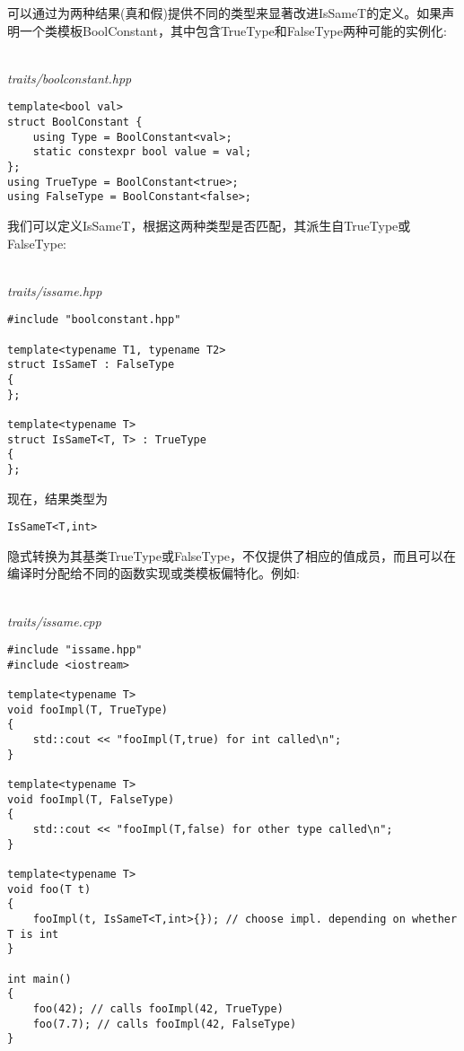可以通过为两种结果(真和假)提供不同的类型来显著改进IsSameT的定义。如果声明一个类模板BoolConstant，其中包含TrueType和FalseType两种可能的实例化:

\hspace*{\fill} \\ %
\noindent
\textit{traits/boolconstant.hpp}
\begin{lstlisting}[style=styleCXX]
template<bool val>
struct BoolConstant {
	using Type = BoolConstant<val>;
	static constexpr bool value = val;
};
using TrueType = BoolConstant<true>;
using FalseType = BoolConstant<false>;
\end{lstlisting}

我们可以定义IsSameT，根据这两种类型是否匹配，其派生自TrueType或FalseType:

\hspace*{\fill} \\ %
\noindent
\textit{traits/issame.hpp}
\begin{lstlisting}[style=styleCXX]
#include "boolconstant.hpp"

template<typename T1, typename T2>
struct IsSameT : FalseType
{
};

template<typename T>
struct IsSameT<T, T> : TrueType
{
};
\end{lstlisting}

现在，结果类型为

\begin{lstlisting}[style=styleCXX]
IsSameT<T,int>
\end{lstlisting}

隐式转换为其基类TrueType或FalseType，不仅提供了相应的值成员，而且可以在编译时分配给不同的函数实现或类模板偏特化。例如:

\hspace*{\fill} \\ %
\noindent
\textit{traits/issame.cpp}
\begin{lstlisting}[style=styleCXX]
#include "issame.hpp"
#include <iostream>

template<typename T>
void fooImpl(T, TrueType)
{
	std::cout << "fooImpl(T,true) for int called\n";
}

template<typename T>
void fooImpl(T, FalseType)
{
	std::cout << "fooImpl(T,false) for other type called\n";
}

template<typename T>
void foo(T t)
{
	fooImpl(t, IsSameT<T,int>{}); // choose impl. depending on whether T is int
}

int main()
{
	foo(42); // calls fooImpl(42, TrueType)
	foo(7.7); // calls fooImpl(42, FalseType)
}
\end{lstlisting}

